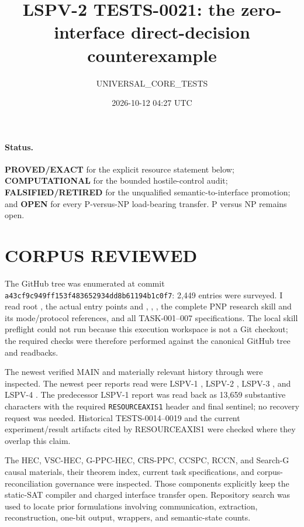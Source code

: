 \documentclass[11pt]{article}
\title{LSPV-2 TESTS-0021: the zero-interface direct-decision counterexample}
\author{UNIVERSAL\_CORE\_TESTS}
\date{2026-10-12 04:27 UTC}
\begin{document}
\maketitle

\paragraph{Status.}
\textbf{PROVED/EXACT} for the explicit resource statement below;
\textbf{COMPUTATIONAL} for the bounded hostile-control audit;
\textbf{FALSIFIED/RETIRED} for the unqualified semantic-to-interface
promotion; and \textbf{OPEN} for every P-versus-NP load-bearing transfer.
P versus NP remains open.

\section{CORPUS REVIEWED}
The GitHub tree was enumerated at commit
\texttt{a43cf9c949ff153f483652934dd8b61194b1c0f7}: 2,449 entries were
surveyed.  I read root , the actual entry points
 and , , ,
the complete PNP research skill and its mode/protocol references, and all
TASK-001--007 specifications.  The local skill preflight could not run because
this execution workspace is not a Git checkout; the required checks were
therefore performed against the canonical GitHub tree and readbacks.

The newest verified MAIN and materially relevant history through
 were inspected.
The newest peer reports read were LSPV-1
, LSPV-2
, LSPV-3
, and LSPV-4
.  The predecessor LSPV-1
report was read back as 13,659 substantive characters with the required
\texttt{RESOURCEAXIS1} header and final sentinel; no recovery request was
needed.  Historical TESTS-0014--0019 and the current experiment/result
artifacts cited by RESOURCEAXIS1 were checked where they overlap this claim.

The HEC, VSC-HEC, G-PPC-HEC, CRS-PPC, CCSPC, RCCN, and Search-G causal
materials, their theorem index, current task specifications, and corpus-
reconciliation governance were inspected.  Those components explicitly keep
the static-SAT compiler and charged interface transfer open.  Repository
search was used to locate prior formulations involving communication,
extraction, reconstruction, one-bit output, wrappers, and semantic-state
counts.
\end{document}
